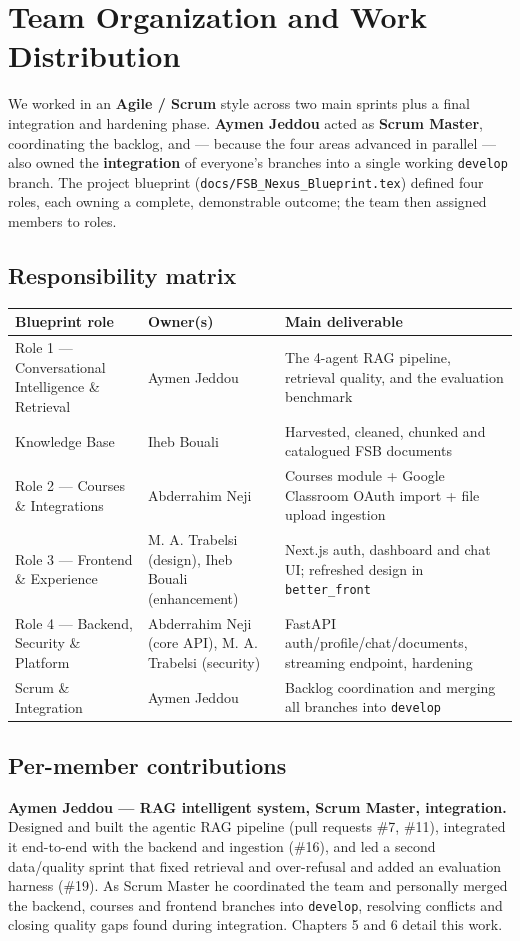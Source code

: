\documentclass[11pt,a4paper]{article}
\begin{document}
\section{Team Organization and Work Distribution}
We worked in an \textbf{Agile / Scrum} style across two main sprints plus a final integration and hardening phase. \textbf{Aymen Jeddou} acted as \textbf{Scrum Master}, coordinating the backlog, and --- because the four areas advanced in parallel --- also owned the \textbf{integration} of everyone's branches into a single working \texttt{develop} branch. The project blueprint (\texttt{docs/FSB\_Nexus\_Blueprint.tex}) defined four roles, each owning a complete, demonstrable outcome; the team then assigned members to roles.

\subsection{Responsibility matrix}
\begin{tabularx}{\textwidth}{@{}p{4.6cm} p{3.8cm} Y@{}}
\toprule
\textbf{Blueprint role} & \textbf{Owner(s)} & \textbf{Main deliverable}\\
\midrule
Role 1 --- Conversational Intelligence \& Retrieval & Aymen Jeddou & The 4-agent RAG pipeline, retrieval quality, and the evaluation benchmark\\
Knowledge Base & Iheb Bouali & Harvested, cleaned, chunked and catalogued FSB documents\\
Role 2 --- Courses \& Integrations & Abderrahim Neji & Courses module + Google Classroom OAuth import + file upload ingestion\\
Role 3 --- Frontend \& Experience & M. A. Trabelsi (design), Iheb Bouali (enhancement) & Next.js auth, dashboard and chat UI; refreshed design in \texttt{better\_front}\\
Role 4 --- Backend, Security \& Platform & Abderrahim Neji (core API), M. A. Trabelsi (security) & FastAPI auth/profile/chat/documents, streaming endpoint, hardening\\
Scrum \& Integration & Aymen Jeddou & Backlog coordination and merging all branches into \texttt{develop}\\
\bottomrule
\end{tabularx}

\subsection{Per-member contributions}
\textbf{Aymen Jeddou --- RAG intelligent system, Scrum Master, integration.} Designed and built the agentic RAG pipeline (pull requests \#7, \#11), integrated it end-to-end with the backend and ingestion (\#16), and led a second data/quality sprint that fixed retrieval and over-refusal and added an evaluation harness (\#19). As Scrum Master he coordinated the team and personally merged the backend, courses and frontend branches into \texttt{develop}, resolving conflicts and closing quality gaps found during integration. Chapters 5 and 6 detail this work.
\end{document}
